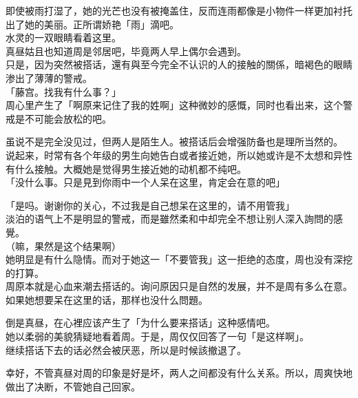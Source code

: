 即使被雨打湿了，她的光芒也没有被掩盖住，反而连雨都像是小物件一样更加衬托出了她的美丽。正所谓娇艳「雨」滴吧。\\

水灵的一双眼睛看着这里。\\

真昼姑且也知道周是邻居吧，毕竟两人早上偶尔会遇到。\\

只是，因为突然被搭话，還有與至今完全不认识的人的接触的關係，暗褐色的眼睛渗出了薄薄的警戒。\\

「藤宫。找我有什么事？」\\

周心里产生了「啊原来记住了我的姓啊」这种微妙的感慨，同时也看出来，这个警戒是不可能会放松的吧。

虽说不是完全没见过，但两人是陌生人。被搭话后会增强防备也是理所当然的。\\

说起来，时常有各个年级的男生向她告白或者接近她，所以她或许是不太想和异性有什么接触。大概她是觉得男生接近她的动机都不纯吧。\\

「没什么事。只是見到你雨中一个人呆在这里，肯定会在意的吧」

「是吗。谢谢你的关心，不过我是自己想呆在这里的，请不用管我」\\

淡泊的语气上不是明显的警戒，而是雖然柔和中却完全不想让别人深入詢問的感覺。\\

（嘛，果然是这个结果啊）\\

她明显是有什么隐情。而对于她这一「不要管我」这一拒绝的态度，周也没有深挖的打算。\\

周原本就是心血来潮去搭话的。询问原因只是自然的发展，并不是周有多么在意。\\

如果她想要呆在这里的话，那样也没什么問題。

倒是真昼，在心裡应该产生了「为什么要来搭话」这种感情吧。\\

她以柔弱的美貌猜疑地看着周。于是，周仅仅回答了一句「是这样啊」。\\

继续搭话下去的话必然会被厌恶，所以是时候該撤退了。

幸好，不管真昼对周的印象是好是坏，两人之间都没有什么关系。所以，周爽快地做出了决断，不管她自己回家。\\

